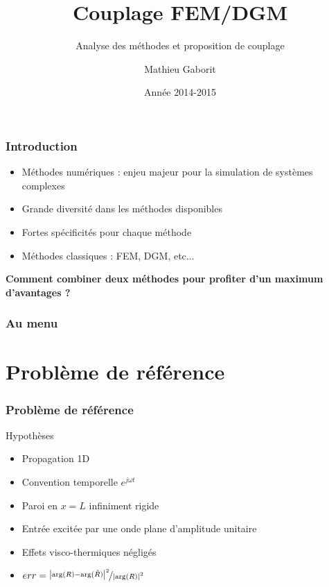 \documentclass[10pt, compress]{beamer}
\title{Couplage FEM/DGM}
\subtitle{Analyse des méthodes et proposition de couplage}
\date{Année 2014-2015}
\author{Mathieu Gaborit}
\institute{Université du Maine}
\begin{document}
\maketitle

\begin{frame}[fragile]
    \frametitle{Introduction}

    \begin{itemize}
        \item Méthodes numériques : enjeu majeur pour la simulation de systèmes complexes
        \item Grande diversité dans les méthodes disponibles
        \item Fortes spécificités pour chaque méthode
        \item Méthodes classiques : FEM, DGM, etc...
    \end{itemize}

    \pause
    \begin{center}
        \alert{\textbf{Comment combiner deux méthodes pour profiter d'un maximum d'avantages ?}}
    \end{center}
\end{frame}

\begin{frame}
	\frametitle{Au menu}
	\tableofcontents
\end{frame}

\section{Problème de référence}

\begin{frame}
	\frametitle{Problème de référence}
	\begin{center}
		
	\end{center}

	\begin{block}{Hypothèses}
		\begin{itemize}
			\item Propagation 1D
			\item Convention temporelle $e^{j\omega t}$
			\item Paroi en $x=L$ infiniment rigide
			\item Entrée excitée par une onde plane d'amplitude unitaire
			\item Effets visco-thermiques négligés
			\item $err = \nicefrac{\left|\arg(R) - \arg(\hat{R})\right|^2}{\left|\arg(R)\right|^2}$
		\end{itemize}
	\end{block}
\end{frame}
\end{document}
